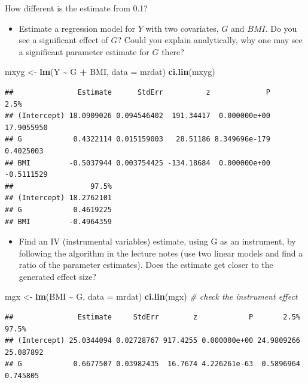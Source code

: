 \documentclass[
]{book}
\newenvironment{Shaded}{\begin{snugshade}}{\end{snugshade}}
\newcommand{\AttributeTok}[1]{\textcolor[rgb]{0.13,0.29,0.53}{#1}}
\newcommand{\CommentTok}[1]{\textcolor[rgb]{0.56,0.35,0.01}{\textit{#1}}}
\newcommand{\FunctionTok}[1]{\textcolor[rgb]{0.13,0.29,0.53}{\textbf{#1}}}
\newcommand{\NormalTok}[1]{#1}
\newcommand{\OtherTok}[1]{\textcolor[rgb]{0.56,0.35,0.01}{#1}}
\newcommand{\SpecialCharTok}[1]{\textcolor[rgb]{0.81,0.36,0.00}{\textbf{#1}}}
\providecommand{\tightlist}{%
  \setlength{\itemsep}{0pt}\setlength{\parskip}{0pt}}
\theoremstyle{definition}
\theoremstyle{definition}
\theoremstyle{definition}
\theoremstyle{definition}
\theoremstyle{remark}
\begin{document}
How different is the estimate from 0.1?

\begin{itemize}
\tightlist
\item
  Estimate a regression model for \(Y\) with two covariates, \(G\) and \(BMI\). Do you see a significant effect of \(G\)? Could you explain analytically, why one may see a significant parameter estimate for \(G\) there?
\end{itemize}

\begin{Shaded}
\begin{Highlighting}[]
\NormalTok{mxyg }\OtherTok{\textless{}{-}} \FunctionTok{lm}\NormalTok{(Y }\SpecialCharTok{\textasciitilde{}}\NormalTok{ G }\SpecialCharTok{+}\NormalTok{ BMI, }\AttributeTok{data =}\NormalTok{ mrdat)}
\FunctionTok{ci.lin}\NormalTok{(mxyg)}
\end{Highlighting}
\end{Shaded}

\begin{verbatim}
##               Estimate      StdErr          z             P       2.5%
## (Intercept) 18.0909026 0.094546402  191.34417  0.000000e+00 17.9055950
## G            0.4322114 0.015159003   28.51186 8.349696e-179  0.4025003
## BMI         -0.5037944 0.003754425 -134.18684  0.000000e+00 -0.5111529
##                  97.5%
## (Intercept) 18.2762101
## G            0.4619225
## BMI         -0.4964359
\end{verbatim}

\begin{itemize}
\tightlist
\item
  Find an IV (instrumental variables) estimate, using G as an instrument, by following the algorithm in the lecture notes (use two linear models and find a ratio of the parameter estimates). Does the estimate get closer to the generated effect size?
\end{itemize}

\begin{Shaded}
\begin{Highlighting}[]
\NormalTok{mgx }\OtherTok{\textless{}{-}} \FunctionTok{lm}\NormalTok{(BMI }\SpecialCharTok{\textasciitilde{}}\NormalTok{ G, }\AttributeTok{data =}\NormalTok{ mrdat)}
\FunctionTok{ci.lin}\NormalTok{(mgx) }\CommentTok{\# check the instrument effect}
\end{Highlighting}
\end{Shaded}

\begin{verbatim}
##               Estimate     StdErr        z            P       2.5%     97.5%
## (Intercept) 25.0344094 0.02728767 917.4255 0.000000e+00 24.9809266 25.087892
## G            0.6677507 0.03982435  16.7674 4.226261e-63  0.5896964  0.745805
\end{verbatim}
\end{document}
